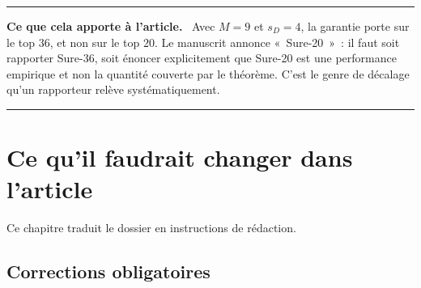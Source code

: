 \documentclass[11pt]{article}
\theoremstyle{plain}
\theoremstyle{definition}
\theoremstyle{remark}
\newcommand{\1}{\mathbf 1}
\newenvironment{apport}
  {\par\medskip\noindent\begingroup\color{bleu}\rule{\linewidth}{0.6pt}\par
   \nobreak\vspace{2pt}\noindent\textbf{Ce que cela apporte à l'article.}\ \normalcolor}
  {\par\vspace{2pt}\noindent\textcolor{bleu}{\rule{\linewidth}{0.6pt}}\endgroup\par\medskip}
\begin{document}
\begin{apport}
Avec $M=9$ et $s_D=4$, la garantie porte sur le top $36$, et non sur le
top $20$. Le manuscrit annonce «~Sure-20~»~: il faut soit rapporter
Sure-36, soit énoncer explicitement que Sure-20 est une performance
empirique et non la quantité couverte par le théorème. C'est le genre de
décalage qu'un rapporteur relève systématiquement.
\end{apport}

\clearpage

\section{Ce qu'il faudrait changer dans l'article}\label{ch:changements}

Ce chapitre traduit le dossier en instructions de rédaction.

\subsection{Corrections obligatoires}
\end{document}
